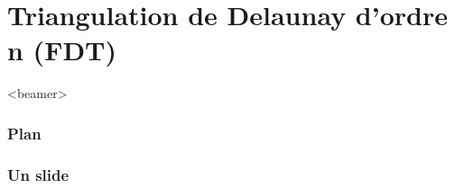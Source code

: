 \section{Triangulation de Delaunay d'ordre n (FDT)}

  \begin{frame}<beamer>
    \frametitle{Plan}
    \tableofcontents[currentsection]
  \end{frame}

\begin{frame}
  	\frametitle{Un slide}


\end{frame}

